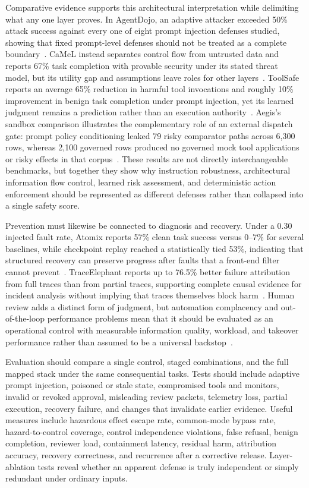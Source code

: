 Comparative evidence supports this architectural interpretation while delimiting what any one layer proves. In AgentDojo, an adaptive attacker exceeded 50\% attack success against every one of eight prompt injection defenses studied, showing that fixed prompt-level defenses should not be treated as a complete boundary~\cite{zhan2025adaptiveattacks}. CaMeL instead separates control flow from untrusted data and reports 67\% task completion with provable security under its stated threat model, but its utility gap and assumptions leave roles for other layers~\cite{debenedetti2025camel}. ToolSafe reports an average 65\% reduction in harmful tool invocations and roughly 10\% improvement in benign task completion under prompt injection, yet its learned judgment remains a prediction rather than an execution authority~\cite{mou2026toolsafe}. Aegis's sandbox comparison illustrates the complementary role of an external dispatch gate: prompt policy conditioning leaked 79 risky comparator paths across 6,300 rows, whereas 2,100 governed rows produced no governed mock tool applications or risky effects in that corpus~\cite{mazzocchetti2026aegis}. These results are not directly interchangeable benchmarks, but together they show why instruction robustness, architectural information flow control, learned risk assessment, and deterministic action enforcement should be represented as different defenses rather than collapsed into a single safety score.

Prevention must likewise be connected to diagnosis and recovery. Under a 0.30 injected fault rate, Atomix reports 57\% clean task success versus 0--7\% for several baselines, while checkpoint replay reached a statistically tied 53\%, indicating that structured recovery can preserve progress after faults that a front-end filter cannot prevent~\cite{mohammadi2026atomix}. TraceElephant reports up to 76.5\% better failure attribution from full traces than from partial traces, supporting complete causal evidence for incident analysis without implying that traces themselves block harm~\cite{chen2026traceelephant}. Human review adds a distinct form of judgment, but automation complacency and out-of-the-loop performance problems mean that it should be evaluated as an operational control with measurable information quality, workload, and takeover performance rather than assumed to be a universal backstop~\cite{parasuraman2010complacency,endsley1995outoftheloop}.

Evaluation should compare a single control, staged combinations, and the full mapped stack under the same consequential tasks. Tests should include adaptive prompt injection, poisoned or stale state, compromised tools and monitors, invalid or revoked approval, misleading review packets, telemetry loss, partial execution, recovery failure, and changes that invalidate earlier evidence. Useful measures include hazardous effect escape rate, common-mode bypass rate, hazard-to-control coverage, control independence violations, false refusal, benign completion, reviewer load, containment latency, residual harm, attribution accuracy, recovery correctness, and recurrence after a corrective release. Layer-ablation tests reveal whether an apparent defense is truly independent or simply redundant under ordinary inputs.

